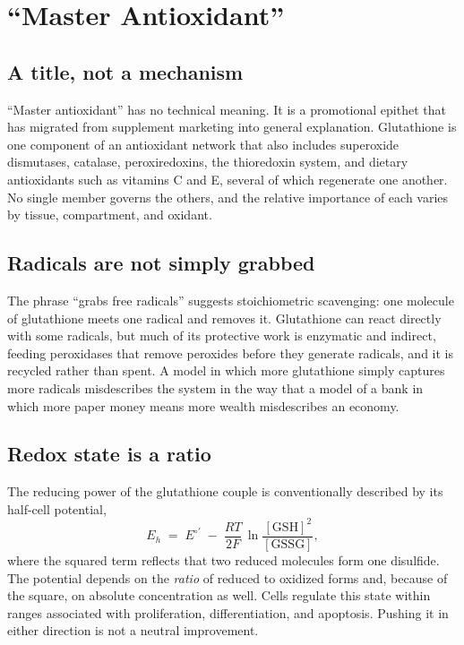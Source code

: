 \documentclass[11pt,a4paper]{article}
\theoremstyle{plain}
\theoremstyle{definition}
\theoremstyle{remark}
\newcommand{\GSH}{\mathrm{GSH}}
\newcommand{\GSSG}{\mathrm{GSSG}}
\begin{document}
\section{``Master Antioxidant''}

\subsection{A title, not a mechanism}

``Master antioxidant'' has no technical meaning. It is a promotional epithet that has migrated from supplement marketing into general explanation. Glutathione is one component of an antioxidant network that also includes superoxide dismutases, catalase, peroxiredoxins, the thioredoxin system, and dietary antioxidants such as vitamins C and E, several of which regenerate one another. No single member governs the others, and the relative importance of each varies by tissue, compartment, and oxidant.

\subsection{Radicals are not simply grabbed}

The phrase ``grabs free radicals'' suggests stoichiometric scavenging: one molecule of glutathione meets one radical and removes it. Glutathione can react directly with some radicals, but much of its protective work is enzymatic and indirect, feeding peroxidases that remove peroxides before they generate radicals, and it is recycled rather than spent. A model in which more glutathione simply captures more radicals misdescribes the system in the way that a model of a bank in which more paper money means more wealth misdescribes an economy.

\subsection{Redox state is a ratio}

The reducing power of the glutathione couple is conventionally described by its half-cell potential,
\[
E_h \;=\; E^{\circ\prime} \;-\; \frac{RT}{2F}\,\ln\frac{[\GSH]^2}{[\GSSG]},
\]
where the squared term reflects that two reduced molecules form one disulfide. The potential depends on the \emph{ratio} of reduced to oxidized forms and, because of the square, on absolute concentration as well. Cells regulate this state within ranges associated with proliferation, differentiation, and apoptosis. Pushing it in either direction is not a neutral improvement.
\end{document}
